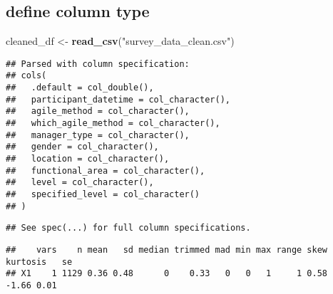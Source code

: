 \documentclass[]{article}
\newenvironment{Shaded}{\begin{snugshade}}{\end{snugshade}}
\newcommand{\CommentTok}[1]{\textcolor[rgb]{0.56,0.35,0.01}{\textit{#1}}}
\newcommand{\DataTypeTok}[1]{\textcolor[rgb]{0.13,0.29,0.53}{#1}}
\newcommand{\KeywordTok}[1]{\textcolor[rgb]{0.13,0.29,0.53}{\textbf{#1}}}
\newcommand{\NormalTok}[1]{#1}
\newcommand{\OperatorTok}[1]{\textcolor[rgb]{0.81,0.36,0.00}{\textbf{#1}}}
\newcommand{\StringTok}[1]{\textcolor[rgb]{0.31,0.60,0.02}{#1}}
\begin{document}
\hypertarget{define-column-type}{%
\subsection{define column type}\label{define-column-type}}

\begin{Shaded}
\begin{Highlighting}[]
\NormalTok{cleaned_df <-}\StringTok{ }\KeywordTok{read_csv}\NormalTok{(}\StringTok{"survey_data_clean.csv"}\NormalTok{)}
\end{Highlighting}
\end{Shaded}

\begin{verbatim}
## Parsed with column specification:
## cols(
##   .default = col_double(),
##   participant_datetime = col_character(),
##   agile_method = col_character(),
##   which_agile_method = col_character(),
##   manager_type = col_character(),
##   gender = col_character(),
##   location = col_character(),
##   functional_area = col_character(),
##   level = col_character(),
##   specified_level = col_character()
## )
\end{verbatim}

\begin{verbatim}
## See spec(...) for full column specifications.
\end{verbatim}

\begin{Shaded}
\end{Shaded}

\begin{verbatim}
##    vars    n mean   sd median trimmed mad min max range skew kurtosis   se
## X1    1 1129 0.36 0.48      0    0.33   0   0   1     1 0.58    -1.66 0.01
\end{verbatim}
\end{document}

